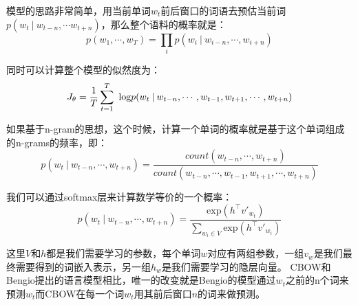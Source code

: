 模型的思路非常简单，用当前单词$w_t$前后窗口的词语去预估当前词$p(w_t \: | \: w_{t-n} , \cdots w_{t+n})$，那么整个语料的概率就是：
\begin{equation}
p(w_1 , \cdots , w_T) = \prod\limits_i p(w_i \: | \: w_{i-n} , \cdots , w_{i+n})
\end{equation}

同时可以计算整个模型的似然度为：
\begin{equation}
J_\theta = \frac{1}{T}\sum\limits_{t=1}^T\ \text{log} \space p(w_t \: | \: w_{t-n} , \cdots , w_{t-1}, w_{t+1}, \cdots , w_{t+n})
\end{equation}

如果基于n-gram的思想，这个时候，计算一个单词的概率就是基于这个单词组成的n-grams的频率，即：
\begin{equation}
p(w_t \: | \: w_{t-n} , \cdots , w_{t+n}) = \dfrac{count(w_{t-n}, \cdots , w_{t+n})}{count({w_{t-n}, \cdots , w_{t-1}, w_{t+1},\cdots, w_{t+n}})}
\end{equation}

我们可以通过softmax层来计算数学等价的一个概率：
\begin{equation}
p(w_t \: | \: w_{t-n} , \cdots , w_{t+n}) = \dfrac{\text{exp}({h^\top v'_{w_t}})}{\sum_{w_i \in V} \text{exp}({h^\top v'_{w_i}})}
\end{equation}

这里$V$和$h$都是我们需要学习的参数，每个单词$w$对应有两组参数，一组$v_w$是我们最终需要得到的词嵌入表示，另一组$h_w$是我们需要学习的隐层向量。
CBOW和Bengio提出的语言模型相比，唯一的改变就是Bengio的模型通过$w_t$之前的n个词来预测$w_t$而CBOW在每一个词$w_t$用其前后窗口$n$的词来做预测。
